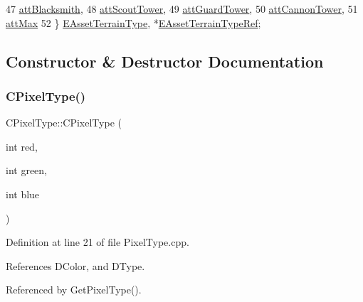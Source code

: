 \begin{DoxyCode}
47             \hyperlink{classCPixelType_af06457fd1c2ff34c67ce670e633a10b0aeecaed906b245b7ff44b4d6a55345d52}{attBlacksmith},
48             \hyperlink{classCPixelType_af06457fd1c2ff34c67ce670e633a10b0a734772bfa3f575ca8811485873e2478b}{attScoutTower},
49             \hyperlink{classCPixelType_af06457fd1c2ff34c67ce670e633a10b0ab5afa80bf72a1e1fd366490591794229}{attGuardTower},
50             \hyperlink{classCPixelType_af06457fd1c2ff34c67ce670e633a10b0a9220629e324fc6cfb6eb9e0f9853354c}{attCannonTower},
51             \hyperlink{classCPixelType_af06457fd1c2ff34c67ce670e633a10b0aba7dc66927790d80f52e095181fdd8f3}{attMax}
52         \} \hyperlink{classCPixelType_af06457fd1c2ff34c67ce670e633a10b0}{EAssetTerrainType}, *\hyperlink{classCPixelType_aa7603ccb4887263fd6f78d5e84124bae}{EAssetTerrainTypeRef};
\end{DoxyCode}


\subsection{Constructor \& Destructor Documentation}
\hypertarget{classCPixelType_a393381dca7114d6279bcee1e5f280e4b}{}\label{classCPixelType_a393381dca7114d6279bcee1e5f280e4b} 
\subsubsection{\texorpdfstring{C\+Pixel\+Type()}{CPixelType()}\hspace{0.1cm}{\footnotesize\ttfamily [1/4]}}
{\footnotesize\ttfamily C\+Pixel\+Type\+::\+C\+Pixel\+Type (\begin{DoxyParamCaption}\item[{int}]{red,  }\item[{int}]{green,  }\item[{int}]{blue }\end{DoxyParamCaption})}



Definition at line 21 of file Pixel\+Type.\+cpp.



References D\+Color, and D\+Type.



Referenced by Get\+Pixel\+Type().


